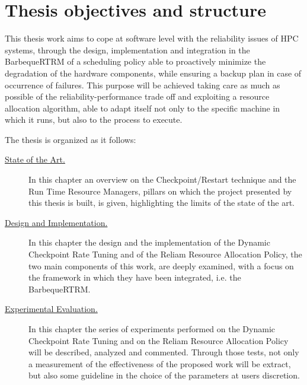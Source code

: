 \section{Thesis objectives and structure}
This thesis work aims to cope at software level with the reliability issues of HPC systems, through the design, implementation and integration in the BarbequeRTRM of a scheduling policy able to proactively minimize the degradation of the hardware components, while ensuring a backup plan in case of occurrence of failures. This purpose will be achieved taking care as much as possible of the reliability-performance trade off and exploiting a resource allocation algorithm, able to adapt itself not only to the specific machine in which it runs, but also to the process to execute. 

The thesis is organized as it follows: 
\begin{description}
\item[{\hyperref[cap:stateofart]{State of the Art.}}] In this chapter an overview on the Checkpoint/Restart technique and the Run Time Resource Managers, pillars on which the project presented by this thesis is built, is given, highlighting the limits of the state of the art.
\item[{\hyperref[cap:implementation]{Design and Implementation.}}] In this chapter the design and the implementation of the Dynamic Checkpoint Rate Tuning and of the Reliam Resource Allocation Policy, the two main components of this work, are deeply examined, with a focus on the framework in which they have been integrated, i.e. the BarbequeRTRM.
\item[{\hyperref[cap:experimental]{Experimental Evaluation.}}] In this chapter the series of experiments performed on the Dynamic Checkpoint Rate Tuning and on the Reliam Resource Allocation Policy will be described, analyzed and commented. Through those tests, not only a measurement of the effectiveness of the proposed work will be extract, but also some guideline in the choice of the parameters at users discretion.
\end{description}